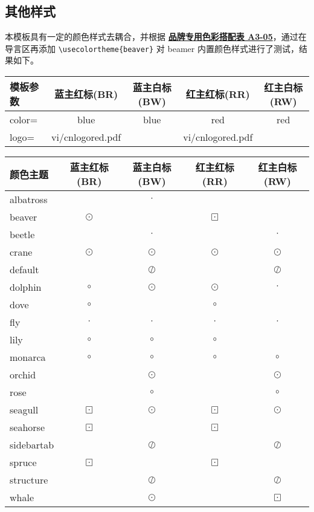 \documentclass[a4paper,12pt]{article}
\begin{document}
\clearpage
\subsection{其他样式}

本模板具有一定的颜色样式去耦合，并根据 \href{http://vi.sjtu.edu.cn/index.php/articles/base/3}{\textbf{品牌专用色彩搭配表 A3-05}}，通过在导言区再添加 \verb"\usecolortheme{beaver}"
对 \textsf{beamer} 内置颜色样式进行了测试，结果如下。

\begin{center}
    \begin{tabular}{|>{\ttfamily}m{5em}|c|c|c|c|}
        \hline
        模板参数 & 蓝主红标(BR) & 蓝主白标(BW) & 红主红标(RR) & 红主白标(RW) \\
        \hline
        color=   & \scriptsize\ttfamily blue & \scriptsize\ttfamily blue & \scriptsize\ttfamily red           & \scriptsize\ttfamily red   \\
        logo=    & \scriptsize\ttfamily vi/cnlogored.pdf & &\scriptsize\ttfamily  vi/cnlogored.pdf& \\
        \hline
    \end{tabular}

    \begin{tabular}{|>{\ttfamily}m{5em}|c|c|c|c|}
        \hline
        颜色主题 & 蓝主红标(BR) & 蓝主白标(BW) & 红主红标(RR) & 红主白标(RW) \\
        \hline
        albatross   &           & $\cdot$ &          &   \\
        beaver      & $\odot $  &         & $\boxdot $ &          \\
        beetle      &           & $\cdot$  &          & $\cdot$  \\
        crane       & $\odot $  & $\odot $ & $\odot $  & $\odot $ \\
        default     & & $\oslash$ &  & $\oslash$ \\
        dolphin     & $\circ $  & $\odot $ & $\odot $  & $\cdot$ \\
        dove        & $\circ$   &          & $\circ$   &  \\
        fly         & $\cdot$   & $\cdot$ & $\cdot$ & $\cdot$  \\
        lily        & $\circ$   &  $\circ$ & $\circ$ & \\
        monarca     & $\circ$   &  $\circ$  &  $\circ$  &  $\circ$  \\
        orchid      &           & $\odot $ & & $\odot $\\
        rose    &  &$\circ$ & & $\circ$  \\
        seagull & $\boxdot$ & $\odot $ & $\boxdot$ & $\odot $ \\
        seahorse & $\boxdot$ & & $\boxdot$ & \\
        sidebartab & & $\oslash  $ & & $\oslash  $ \\
        spruce  & $\boxdot$ & & $\boxdot$ & \\
        structure & & $\oslash  $ &  & $\oslash  $\\
        whale & & $\odot $ & & $\boxdot $ \\
        \hline
    \end{tabular}


\end{center}
\end{document}
